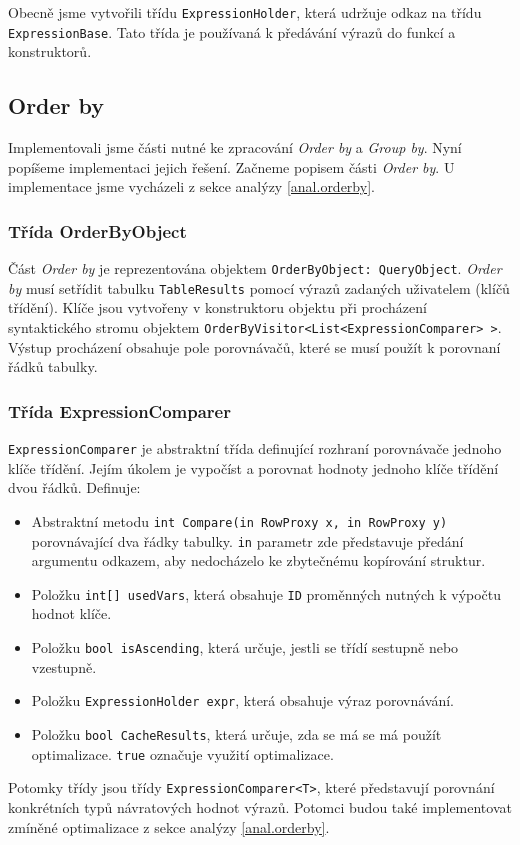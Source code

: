 Obecně jsme vytvořili třídu \texttt{ExpressionHolder}, která udržuje odkaz na třídu \texttt{ExpressionBase}.
Tato třída je používaná k předávání výrazů do funkcí a konstruktorů.

\subsection{Order by}

Implementovali jsme části nutné ke zpracování \textit{Order by} a \textit{Group by}.
Nyní popíšeme implementaci jejich řešení.
Začneme popisem části \textit{Order by}.
U implementace jsme vycházeli z sekce analýzy \ref{anal.orderby}.

\subsubsection{Třída OrderByObject}

Část \textit{Order by} je reprezentována objektem \texttt{OrderByObject: QueryObject}.
\textit{Order by} musí setřídit tabulku \texttt{TableResults} pomocí výrazů zadaných uživatelem (klíčů třídění).
Klíče jsou vytvořeny v konstruktoru objektu při procházení syntaktického stromu objektem \texttt{OrderByVisitor<List<ExpressionComparer> >}.
Výstup procházení obsahuje pole porovnávačů, které se musí použít k porovnaní řádků tabulky.

\subsubsection{Třída ExpressionComparer}

\texttt{ExpressionComparer} je abstraktní třída definující rozhraní porovnávače jednoho klíče třídění.
Jejím úkolem je vypočíst a porovnat hodnoty jednoho klíče třídění dvou řádků.
Definuje:
\begin{itemize}
\item Abstraktní metodu \texttt{int Compare(in RowProxy x, in RowProxy y)} porovnávající dva řádky tabulky.
\texttt{in} parametr zde představuje předání argumentu odkazem, aby nedocházelo ke zbytečnému kopírování struktur.
\item Položku \texttt{int[] usedVars}, která obsahuje \texttt{ID} proměnných nutných k výpočtu hodnot klíče.
\item Položku \texttt{bool isAscending}, která určuje, jestli se třídí sestupně nebo vzestupně.
\item Položku \texttt{ExpressionHolder expr}, která obsahuje výraz porovnávání.
\item Položku \texttt{bool CacheResults}, která určuje, zda se má se má použít optimalizace.
\texttt{true} označuje využití optimalizace.

\end{itemize}
Potomky třídy jsou třídy \texttt{ExpressionComparer<T>}, které představují porovnání konkrétních typů návratových hodnot výrazů.
Potomci budou také implementovat zmíněné optimalizace z sekce analýzy \ref{anal.orderby}.

